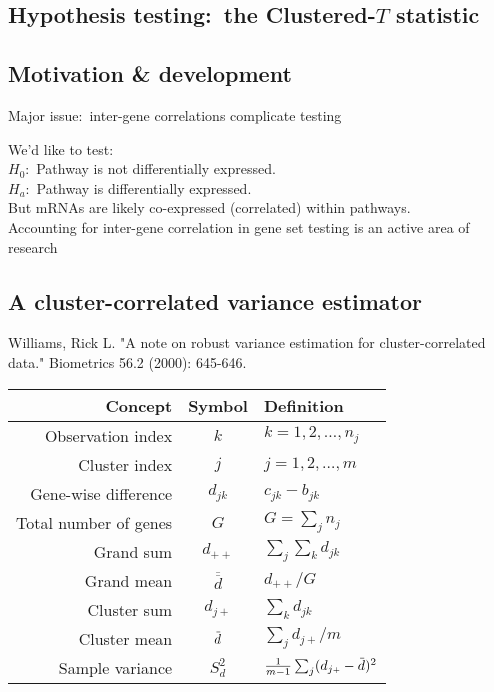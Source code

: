 \documentclass[a0,portrait]{a0poster}
\newcommand*{\barbar}[1]{\overline{\overline{#1}}}
\newcommand{\overbar}[1]{\mkern 3mu\overline{\mkern-3mu#1\mkern-1.mu}\mkern 1.mu}
\begin{document}
\begin{multicols}{3}
\section*{Hypothesis testing:~the Clustered-$T$ statistic}
\subsection*{Motivation \& development}

Major issue:~inter-gene correlations complicate testing

We'd like to test:\\
$H_{0}$:~Pathway is not differentially expressed. \\
$H_{a}$:~Pathway is differentially expressed.\\
But mRNAs are likely co-expressed (correlated) within pathways.\\
Accounting for inter-gene correlation in gene set testing is an active area of research\cite{Wu2012,Tamayo2016}


\subsection*{A cluster-correlated variance estimator}

  Williams, Rick L. "A note on robust variance estimation for cluster-correlated data." Biometrics 56.2 (2000): 645-646.

  \begin{tabular}{r | c | l }
    Concept & Symbol & Definition \\
    \hline \hline
      Observation index & $k$ & $k = 1,2,\ldots,n_j$ \\
      Cluster index & $j$ & $j = 1,2,\ldots,m$ \\
      Gene-wise difference & $d_{jk}$ & $c_{jk} - b_{jk}$ \\
      Total number of genes & $G$ & $G = \sum_{j} n_{j}$ \\
      Grand sum & $d_{\scriptscriptstyle{++}}$ & $\sum_j \sum_k d_{jk}$ \\
      Grand mean & $\barbar{d}$ & $d_{\scriptscriptstyle{++}}/G$ \\
      Cluster sum & $d_{j\scriptscriptstyle{+}}$ & $\sum_k d_{jk}$ \\
      Cluster mean & $\overbar{d}$ & $\sum_j d_{j\scriptscriptstyle{+}}/m$ \\
      Sample variance & $S_{d}^{2}$ & $\frac{1}{m-1}\sum_j(d_{j\scriptscriptstyle{+}} - \overbar{d})^2$\\
\end{tabular}


\end{multicols}
\end{document}
